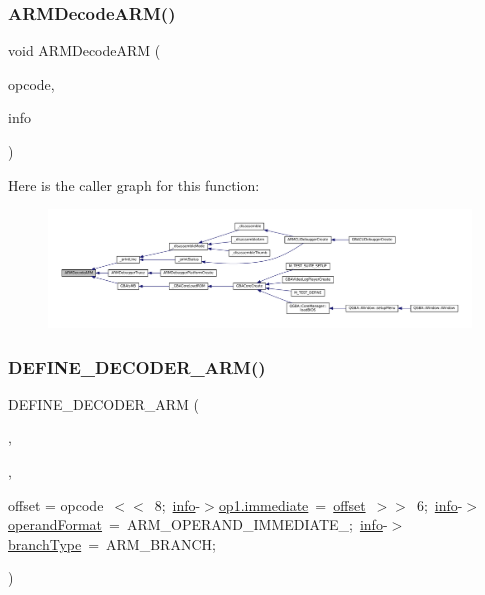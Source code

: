 \subsubsection{\texorpdfstring{A\+R\+M\+Decode\+A\+R\+M()}{ARMDecodeARM()}}
{\footnotesize\ttfamily void A\+R\+M\+Decode\+A\+RM (\begin{DoxyParamCaption}\item[{uint32\+\_\+t}]{opcode,  }\item[{struct A\+R\+M\+Instruction\+Info $\ast$}]{info }\end{DoxyParamCaption})}

Here is the caller graph for this function\+:
\nopagebreak
\begin{figure}[H]
\begin{center}
\leavevmode
\includegraphics[width=350pt]{decoder-arm_8c_ae0a328e9d3c32fcaa891021b7e6aee89_icgraph}
\end{center}
\end{figure}
\mbox{\label{decoder-arm_8c_ac0da2d3d96bbeb41dd6258af5f447541}} 
\subsubsection{\texorpdfstring{D\+E\+F\+I\+N\+E\+\_\+\+D\+E\+C\+O\+D\+E\+R\+\_\+\+A\+R\+M()}{DEFINE\_DECODER\_ARM()}\hspace{0.1cm}{\footnotesize\ttfamily [1/6]}}
{\footnotesize\ttfamily D\+E\+F\+I\+N\+E\+\_\+\+D\+E\+C\+O\+D\+E\+R\+\_\+\+A\+RM (\begin{DoxyParamCaption}\item[{B}]{,  }\item[{B}]{,  }\item[{int32\+\_\+t}]{offset = {\ttfamily opcode~$<$$<$~8;~\mbox{\hyperlink{libretro_8h_a283ad41e4809f9c0ebe736a9861d8a91}{info}}-\/$>$\mbox{\hyperlink{lr35902_2decoder_8c_a8bc2501cb64b3bc9ac59754cfafb68d1}{op1.\+immediate}}~=~\mbox{\hyperlink{ioapi_8h_a601c4660e8a1a14a1b87fe387e934d19}{offset}}~$>$$>$~6;~\mbox{\hyperlink{libretro_8h_a283ad41e4809f9c0ebe736a9861d8a91}{info}}-\/$>$\mbox{\hyperlink{decoder-thumb_8c_a52313e50f86644324806d9228ecd8472}{operand\+Format}}~=~ARM\+\_\+OPERAND\+\_\+IMMEDIATE\+\_;~\mbox{\hyperlink{libretro_8h_a283ad41e4809f9c0ebe736a9861d8a91}{info}}-\/$>$\mbox{\hyperlink{decoder-thumb_8c_a8dbbd417010e59d26bfaf79cb6139102}{branch\+Type}}~=~ARM\+\_\+BRANCH;} }\end{DoxyParamCaption})}

